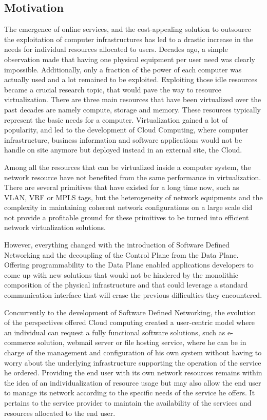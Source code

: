 \subsection{Motivation}

The emergence of online services, and the cost-appealing solution to outsource the exploitation of computer infrastructures has led to a drastic increase in the needs for individual resources allocated to users. Decades ago, a simple observation made that having one physical equipment per user need was clearly impossible. Additionally, only a fraction of the power of each computer was actually used and a lot remained to be exploited.
Exploiting those idle resources became a crucial research topic, that would pave the way to resource virtualization. There are three main resources that have been virtualized over the past decades are namely compute, storage and memory.
These resources typically represent the basic needs for a computer.
Virtualization gained a lot of popularity, and led to the development of Cloud Computing, where computer infrastructure, business information and software applications would not be handle on site anymore but deployed instead in an external site, \ie the Cloud.

Among all the resources that can be virtualized inside a computer system, the network resource have not benefited from the same performance in virtualization.
There are several primitives that have existed for a long time now, such as VLAN, VRF or MPLS tags, but the heterogeneity of network equipments and the complexity in maintaining coherent network configurations on a large scale did not provide a profitable ground for these primitives to be turned into efficient network virtualization solutions.

However, everything changed with the introduction of Software Defined Networking and the decoupling of the Control Plane from the Data Plane. Offering programmability to the Data Plane enabled applications developers to come up with new solutions that would not be hindered by the monolithic composition of the physical infrastructure and that could leverage a standard communication interface that will erase the previous difficulties they encountered.

Concurrently to the development of Software Defined Networking, the evolution of the perspectives offered Cloud computing created a user-centric model where an individual can request a fully functional software solutions, such as e-commerce solution, webmail server or file hosting service, where he can be in charge of the management and configuration of his own system without having to worry about the underlying infrastructure supporting the operation of the service he ordered.
Providing the end user with its own network resources remains within the idea of an individualization of resource usage but may also allow the end user to manage its network according to the specific needs of the service he offers.
It pertains to the service provider to maintain the availability of the services and resources allocated to the end user.

